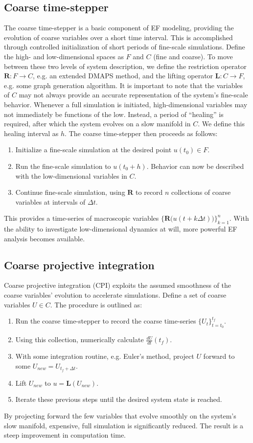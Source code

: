 \documentclass[11pt]{article}
\begin{document}
\subsection{Coarse time-stepper}
\indent The coarse time-stepper is a basic component of EF modeling, providing the evolution of coarse variables over a short time interval. This is accomplished through controlled initialization of short periods of fine-scale simulations. Define the high- and low-dimensional spaces as $F$ and $C$ (fine and coarse). To move between these two levels of system description, we define the restriction operator $\textbf{R}: F \rightarrow C$, e.g. an extended DMAPS method, and the lifting operator $\textbf{L}: C \rightarrow F$, e.g. some graph generation algorithm. It is important to note that the variables of $C$ may not always provide an accurate representation of the system's fine-scale behavior. Whenever a full simulation is initiated, high-dimensional variables may not immediately be functions of the low. Instead, a period of ``healing'' is required, after which the system evolves on a slow manifold in $C$. We define this healing interval as $h$. The coarse time-stepper then proceeds as follows:
\begin{enumerate}
\item Initialize a fine-scale simulation at the desired point $u(t_{0}) \in F$.
\item Run the fine-scale simulation to $u(t_{0}+h)$. Behavior can now be described with the low-dimensional variables in $C$.
\item Continue fine-scale simulation, using $\textbf{R}$ to record $n$ collections of coarse variables at intervals of $\Delta t$. 
\end{enumerate}
This provides a time-series of macroscopic variables $\{ \textbf{R(}u(t+k\Delta t) \textbf{)} \}_{k=1}^{n}$. With the ability to investigate low-dimensional dynamics at will, more powerful EF analysis becomes available.
\subsection{Coarse projective integration}
\indent Coarse projective integration (CPI) exploits the assumed smoothness of the coarse variables' evolution to accelerate simulations. Define a set of coarse variables $U \in C$. The procedure is outlined as:
\begin{enumerate}
\item Run the coarse time-stepper to record the coarse time-series $\{ U_{t} \}_{t=t_{0}}^{t_{f}}$.
\item Using this collection, numerically calculate $\frac{dU}{dt}(t_{f})$.
\item With some integration routine, e.g. Euler's method, project $U$ forward to some $U_{new} = U_{t_{f}+\Delta t}$.
\item Lift $U_{new}$ to $u = \textbf{L}(U_{new})$.
\item Iterate these previous steps until the desired system state is reached.
\end{enumerate}
By projecting forward the few variables that evolve smoothly on the system's slow manifold, expensive, full simulation is significantly reduced. The result is a steep improvement in computation time.
\end{document}
